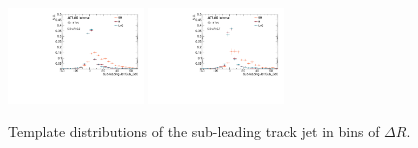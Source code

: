 \begin{figure}[htbp]
 \includegraphics[width=0.32\textwidth]{figures/gbb/Sub_Sd0_Fits/Canv_FitTemplate_05-DeltaR-06_LpT_INF_SpT_INF_y.pdf}
 \includegraphics[width=0.32\textwidth]{figures/gbb/Sub_Sd0_Fits/Canv_FitTemplate_06-DeltaR-07_LpT_INF_SpT_INF_y.pdf}\\

\caption{Template \subsdzero distributions of the sub-leading track jet in bins of $\Delta R$. }
  \label{fig:dR-template-subleading}
\end{figure}

